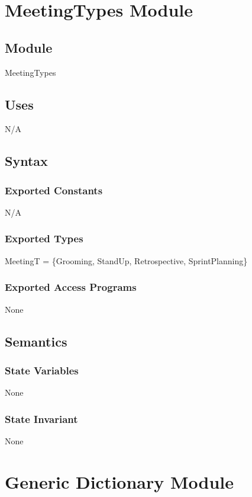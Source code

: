 \documentclass[12pt, titlepage]{article}
\begin{document}
\newpage

\section* {MeetingTypes Module}

\subsection* {Module}
MeetingTypes

\subsection*{Uses}
N/A

\subsection*{Syntax}
\subsubsection*{Exported Constants}
N/A

\subsubsection*{Exported Types}
MeetingT = \{Grooming, StandUp, Retrospective, SprintPlanning\}

\subsubsection*{Exported Access Programs}
None

\subsection*{Semantics}
\subsubsection* {State Variables}
None

\subsubsection* {State Invariant}
None

\newpage

\section*{Generic Dictionary Module}
\end{document}
